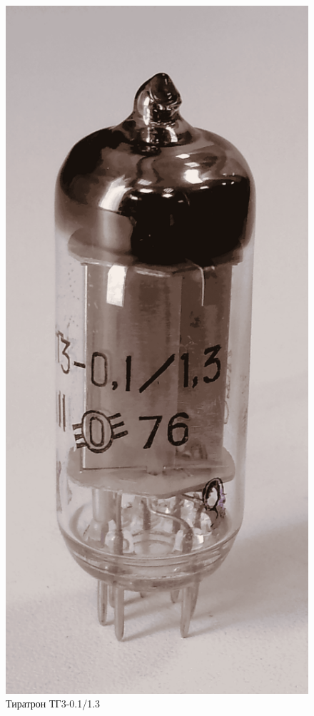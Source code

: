 \documentclass{beamer}
\begin{document}
\begin{frame}
\begin{columns}
\begin{figure}
				\includegraphics[width=\linewidth]{res/tirat_xe.png}
				\caption*{Тиратрон ТГ3-0.1/1.3}
			\end{figure}
		\end{columns}
	\end{frame}	
\end{document}
